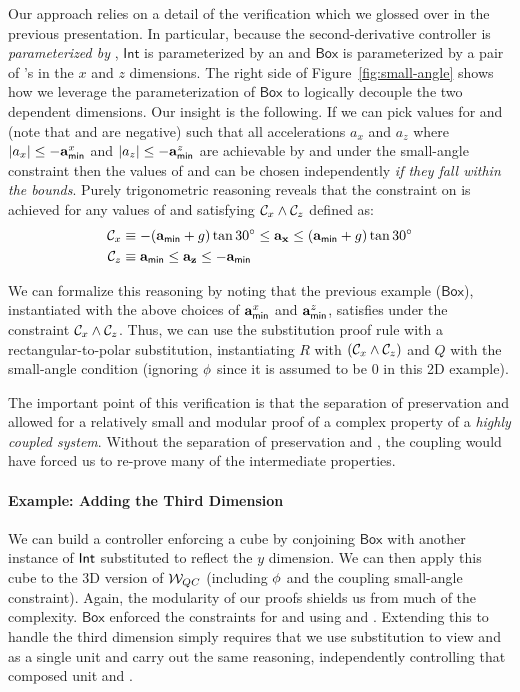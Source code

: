 Our approach relies on a detail of the verification which we glossed over
in the previous presentation.  In particular, because the second-derivative
controller is \emph{parameterized by \Tmin}, $\mathsf{Int}$ is
parameterized by an \Tmin and $\mathsf{Box}$ is parameterized by a pair
of \Tmin's in the $x$ and $z$ dimensions.  The right side of
Figure~\ref{fig:small-angle} shows how we leverage the parameterization of
$\mathsf{Box}$ to logically decouple the two dependent dimensions.  Our
insight is the following.  If we can pick values for \Tminx and \Tminz
(note that \Tminx and \Tminz are negative) such that all accelerations
$a_x$ and $a_z$ where $|a_x| \leq -\mathbf{a}_{\mathsf{min}}^{x}$ and $|a_z| \leq -\mathbf{a}_{\mathsf{min}}^{z}$ are
achievable by  and \tlavar{\pitch} under the small-angle
constraint then the values of  and  can be chosen
independently \emph{if they fall within the bounds}.  Purely trigonometric
reasoning reveals that the constraint on \tlavar{\pitch} is achieved for
any values of  and  satisfying
$\mathcal{C}_{x} \wedge \mathcal{C}_{z}$ defined as:
\begin{align*}
\mathcal{C}_{x} &\equiv -(\mathbf{a}_{\mathsf{min}} + g) \tan 30^{\circ} \leq \mathbf{a_x} \leq  (\mathbf{a}_{\mathsf{min}} + g) \tan 30^{\circ} \\
\mathcal{C}_{z} &\equiv \mathbf{a}_{\mathsf{min}} \leq  \mathbf{a_z}  \leq   -\mathbf{a}_{\mathsf{min}}
\end{align*}

We can formalize this reasoning by noting that the previous example
($\mathsf{Box}$), instantiated with the above choices of $\mathbf{a}_{\mathsf{min}}^{x}$ and
$\mathbf{a}_{\mathsf{min}}^{z}$, satisfies \progress{} under the constraint
$\mathcal{C}_{x} \wedge \mathcal{C}_{z}$.  Thus, we can use the substitution
proof rule  with a
rectangular-to-polar substitution, instantiating $R$ with
$(\mathcal{C}_{x}\wedge\mathcal{C}_{z})$ and $Q$ with the small-angle condition
(ignoring $\mathbf{\phi}$ since it is assumed to be 0 in this 2D example).

The important point of this verification is that the separation of
preservation and \progress{} allowed for a relatively small and modular
proof of a complex property of a \emph{highly coupled system}.  Without the
separation of preservation and \progress{}, the coupling would have forced
us to re-prove many of the intermediate properties.

\paragraph{Example: Adding the Third Dimension}
We can build a controller enforcing a cube by conjoining $\mathsf{Box}$
with another instance of ${\mathsf{Int}}$ substituted to reflect the $y$
dimension.  We can then apply this cube to the 3D version of $\mathcal{W}_{QC}$
(including $\mathbf{\phi}$ and the coupling small-angle constraint).
Again, the modularity of our proofs shields us from much of the complexity.
$\mathsf{Box}$ enforced the constraints for  and 
using  and .  Extending this to handle the third
dimension simply requires that we use substitution to view 
and  as a single unit and carry out the same reasoning,
independently controlling that composed unit and .

